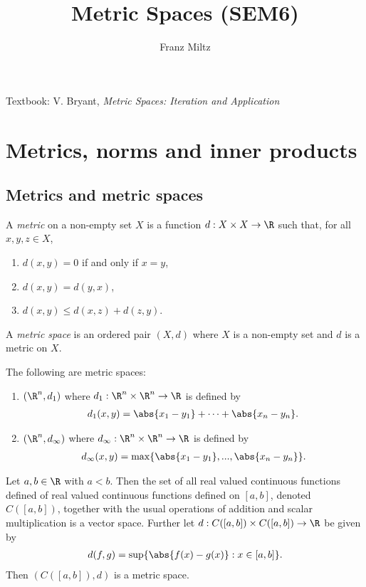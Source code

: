 \documentclass{article}
\begin{document}
\mkthmstwounified
\title{Metric Spaces (SEM6)}
\author{Franz Miltz}
\maketitle
\noindent Textbook: V. Bryant, \emph{Metric Spaces: Iteration and Application}
\tableofcontents
\pagebreak

\section{Metrics, norms and inner products}

\subsection{Metrics and metric spaces}

\begin{definition}
    A \emph{metric} on a non-empty set $X$ is a function $d:X\times X\to\R$
    such that, for all $x,y,z\in X$, 
    \begin{enumerate}
        \item $d(x,y)=0$ if and only if $x=y$,
        \item $d(x,y)=d(y,x)$,
        \item $d(x,y)\leq d(x,z) + d(z,y)$.
    \end{enumerate}
    A \emph{metric space} is an ordered pair $(X,d)$ where $X$ is a non-empty set and 
    $d$ is a metric on $X$.
\end{definition}

\begin{lemma}
    The following are metric spaces:
    \begin{enumerate}
        \item $(\R^n, d_1)$ where $d_1:\R^n\times\R^n\to\R$ is defined by \begin{align*}
            d_1(x,y)=\abs{x_1-y_1}+\cdots+\abs{x_n-y_n}.
        \end{align*} 
        \item $(\R^n, d_\infty)$ where $d_\infty:\R^n\times\R^n\to\R$ is defined by \begin{align*} d_\infty(x,y)=\max\{\abs{x_1-y_1},...,\abs{x_n-y_n}\}.
        \end{align*}
    \end{enumerate}
\end{lemma}

\begin{lemma}
    Let $a,b\in\R$ with $a<b$.
    Then the set of all real valued continuous functions defined of real valued
    continuous functions defined on $[a,b]$, denoted $C([a,b])$, together with
    the usual operations of addition and scalar multiplication is a vector space.
    Further let $d:C([a,b])\times C([a,b])\to \R$ be given by 
    \begin{align*}
        d(f,g)=\sup\{\abs{f(x)-g(x)}:x\in[a,b]\}.
    \end{align*} 
    Then $(C([a,b]),d)$ is a metric space.
\end{lemma}
\end{document}
